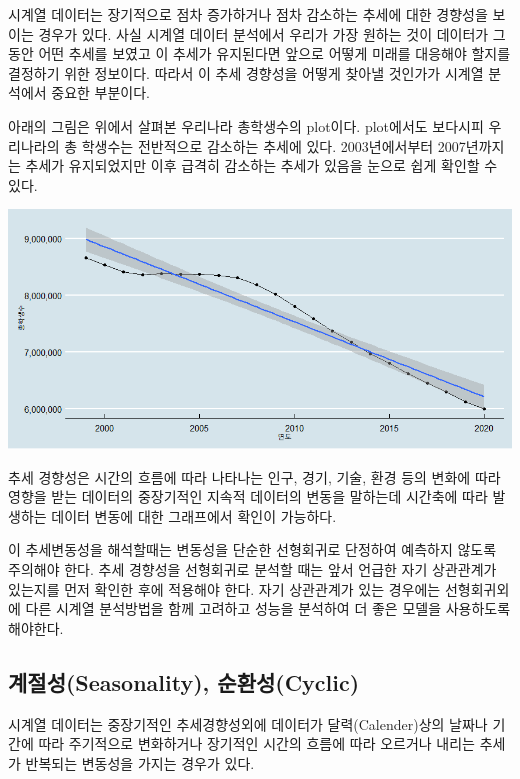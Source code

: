 \documentclass[
]{book}
\begin{document}
시계열 데이터는 장기적으로 점차 증가하거나 점차 감소하는 추세에 대한 경향성을 보이는 경우가 있다. 사실 시계열 데이터 분석에서 우리가 가장 원하는 것이 데이터가 그동안 어떤 추세를 보였고 이 추세가 유지된다면 앞으로 어떻게 미래를 대응해야 할지를 결정하기 위한 정보이다. 따라서 이 추세 경향성을 어떻게 찾아낼 것인가가 시계열 분석에서 중요한 부분이다.

아래의 그림은 위에서 살펴본 우리나라 총학생수의 plot이다. plot에서도 보다시피 우리나라의 총 학생수는 전반적으로 감소하는 추세에 있다. 2003년에서부터 2007년까지는 추세가 유지되었지만 이후 급격히 감소하는 추세가 있음을 눈으로 쉽게 확인할 수 있다.

\includegraphics{trend.png}

추세 경향성은 시간의 흐름에 따라 나타나는 인구, 경기, 기술, 환경 등의 변화에 따라 영향을 받는 데이터의 중장기적인 지속적 데이터의 변동을 말하는데 시간축에 따라 발생하는 데이터 변동에 대한 그래프에서 확인이 가능하다.

이 추세변동성을 해석할때는 변동성을 단순한 선형회귀로 단정하여 예측하지 않도록 주의해야 한다. 추세 경향성을 선형회귀로 분석할 때는 앞서 언급한 자기 상관관계가 있는지를 먼저 확인한 후에 적용해야 한다. 자기 상관관계가 있는 경우에는 선형회귀외에 다른 시계열 분석방법을 함께 고려하고 성능을 분석하여 더 좋은 모델을 사용하도록 해야한다.

\hypertarget{uxacc4uxc808uxc131seasonality-uxc21cuxd658uxc131cyclic}{%
\subsection{계절성(Seasonality), 순환성(Cyclic)}\label{uxacc4uxc808uxc131seasonality-uxc21cuxd658uxc131cyclic}}

시계열 데이터는 중장기적인 추세경향성외에 데이터가 달력(Calender)상의 날짜나 기간에 따라 주기적으로 변화하거나 장기적인 시간의 흐름에 따라 오르거나 내리는 추세가 반복되는 변동성을 가지는 경우가 있다.
\end{document}
